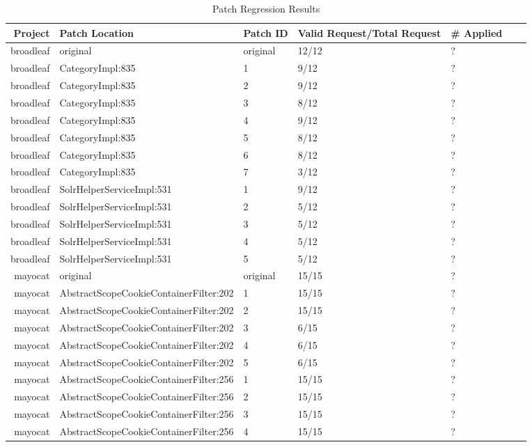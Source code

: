 \begin{table}
  \caption{Patch Regression Results}
  \label{tab:regression}
  \begin{tabular}{|r|l|l|l|l|l|r|}
    \hline
    Project & Patch Location  & Patch ID  & Valid Request/Total Request  & \# Applied \\
    \hline 
    broadleaf & original & original & 12/12 & ? \\
    broadleaf & CategoryImpl:835 & 1 & 9/12 & ? \\
    broadleaf & CategoryImpl:835 & 2 & 9/12 & ? \\
    broadleaf & CategoryImpl:835 & 3 & 8/12 & ? \\
    broadleaf & CategoryImpl:835 & 4 & 9/12 & ? \\
    broadleaf & CategoryImpl:835 & 5 & 8/12 & ? \\
    broadleaf & CategoryImpl:835 & 6 & 8/12 & ? \\
    broadleaf & CategoryImpl:835 & 7 & 3/12 & ? \\
    broadleaf & SolrHelperServiceImpl:531 & 1 & 9/12 & ? \\
    broadleaf & SolrHelperServiceImpl:531 & 2 & 5/12 & ? \\
    broadleaf & SolrHelperServiceImpl:531 & 3 & 5/12 & ? \\
    broadleaf & SolrHelperServiceImpl:531 & 4 & 5/12 & ? \\
    broadleaf & SolrHelperServiceImpl:531 & 5 & 5/12 & ? \\
    mayocat & original & original & 15/15 & ? \\
    mayocat & AbstractScopeCookieContainerFilter:202 & 1 & 15/15 & ? \\
    mayocat & AbstractScopeCookieContainerFilter:202 & 2 & 15/15 & ? \\
    mayocat & AbstractScopeCookieContainerFilter:202 & 3 & 6/15 & ? \\
    mayocat & AbstractScopeCookieContainerFilter:202 & 4 & 6/15 & ? \\
    mayocat & AbstractScopeCookieContainerFilter:202 & 5 & 6/15 & ? \\
    mayocat & AbstractScopeCookieContainerFilter:256 & 1 & 15/15 & ? \\
    mayocat & AbstractScopeCookieContainerFilter:256 & 2 & 15/15 & ? \\
    mayocat & AbstractScopeCookieContainerFilter:256 & 3 & 15/15 & ? \\
    mayocat & AbstractScopeCookieContainerFilter:256 & 4 & 15/15 & ? \\

\end{tabular}
\end{table}
